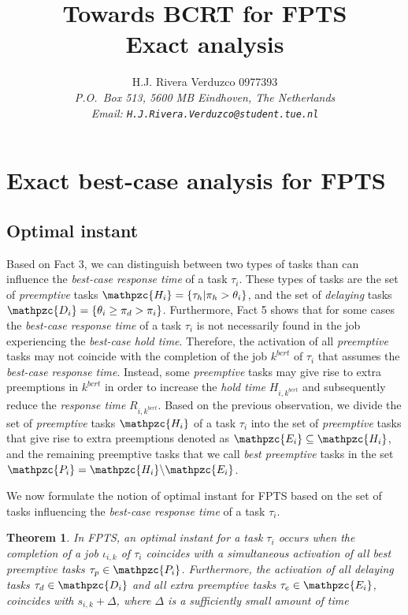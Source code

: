 \documentclass[fleqn]{article}
\title{\sf Towards BCRT for FPTS\\
			Exact analysis}
\author{{\sf H.J. Rivera Verduzco 0977393}\\
{\footnotesize\sl P.O.~Box 513, 5600 MB Eindhoven, The Netherlands}\\
{\footnotesize \sl Email: \tt H.J.Rivera.Verduzco@student.tue.nl}}
\newtheorem{theorem}{Theorem}
\begin{document}
\maketitle


\section{Exact best-case analysis for FPTS}

\subsection{Optimal instant}
Based on Fact 3, we can distinguish between two types of tasks than can influence the \textit{best-case response time} of a task $\tau_i$. These types of tasks are the set of \textit{preemptive} tasks $\mathpzc{H_i}=\{\tau_h | \pi_h>\theta_i\}$, and the set of \textit{delaying} tasks $\mathpzc{D_i}=\{\theta_i \geq \pi_d > \pi_i\}$. Furthermore, Fact 5 shows that for some cases the \textit{best-case response time} of a task $\tau_i$ is not necessarily found in the job experiencing the \textit{best-case hold time}. Therefore, the activation of all \textit{preemptive} tasks may not coincide with the completion of the job $k^{bcrt}$ of $\tau_i$ that assumes the \textit{best-case response time}. Instead, some \textit{preemptive} tasks may give rise to extra preemptions in $k^{bcrt}$ in order to increase the \textit{hold time} $H_{i,k^{bcrt}}$ and subsequently reduce the \textit{response time} $R_{i,k^{bcrt}}$. Based on the previous observation, we divide the set of \textit{preemptive} tasks $\mathpzc{H_i}$ of a task $\tau_i$  into the set of \textit{preemptive} tasks that give rise to extra preemptions denoted as $\mathpzc{E_i} \subseteq \mathpzc{H_i}$, and the remaining preemptive tasks that we call \textit{best preemptive} tasks in the set $\mathpzc{P_i}=\mathpzc{H_i}\backslash\mathpzc{E_i}$.

We now formulate the notion of optimal instant for FPTS based on the set of tasks influencing the \textit{best-case response time} of a task $\tau_i$.

\begin{theorem} \label{thm:optimal_instant_fpts}
	In FPTS, an optimal instant for a task $\tau_i$ occurs when the completion of a job $\iota_{i,k}$ of $\tau_i$ coincides with a simultaneous activation of all \textit{best preemptive} tasks $\tau_p\in\mathpzc{P_i}$. Furthermore, the activation of all delaying tasks $\tau_d \in \mathpzc{D_i}$ and all \textit{extra preemptive} tasks $\tau_e \in \mathpzc{E_i}$, coincides with $s_{i,k}+\Delta$, where $\Delta$ is a sufficiently small amount of time 
\end{theorem}
\end{document}
